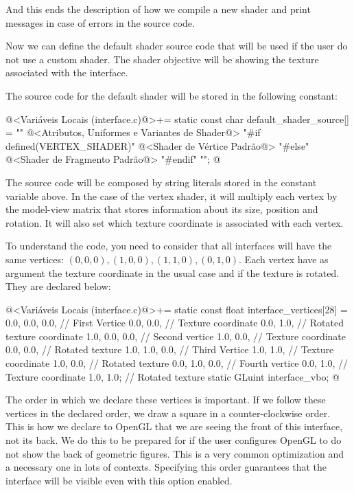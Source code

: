 And this ends the description of how we compile a new shader and print
messages in case of errors in the source code.

Now we can define the default shader source code that will be used if
the user do not use a custom shader. The shader objective will be
showing the texture associated with the interface.

The source code for the default shader will be stored in the following
constant:

\iniciocodigo
@<Variáveis Locais (interface.c)@>+=
static const char default_shader_source[] = ""
@<Atributos, Uniformes e Variantes de Shader@>
"#if defined(VERTEX_SHADER)\n"
@<Shader de Vértice Padrão@>
"#else\n"
@<Shader de Fragmento Padrão@>
"#endif\n"
                                           "";
@
\fimcodigo

The source code will be composed by string literals stored in the
constant variable above. In the case of the vertex shader, it will
multiply each vertex by the model-view matrix that stores information
about its size, position and rotation. It will also set which texture
coordinate is associated with each vertex.

To understand the code, you need to consider that all interfaces will
have the same vertices: $(0, 0, 0), (1, 0, 0), (1, 1, 0), (0, 1,
0)$. Each vertex have as argument the texture coordinate in the usual
case and if the texture is rotated. They are declared below:

\iniciocodigo
@<Variáveis Locais (interface.c)@>+=
static const float interface_vertices[28] = {
  0.0, 0.0, 0.0, // First Vertice
  0.0, 0.0,     // Texture coordinate
  0.0, 1.0,    // Rotated texture coordinate
  1.0, 0.0, 0.0, // Second vertice
  1.0, 0.0,     // Texture coordinate
  0.0, 0.0,    // Rotated texture
  1.0, 1.0, 0.0,  // Third Vertice
  1.0, 1.0,      // Texture coordinate
  1.0, 0.0,     // Rotated texture
  0.0, 1.0, 0.0, // Fourth vertice
  0.0, 1.0,     // Texture coordinate
  1.0, 1.0};   // Rotated texture
static GLuint interface_vbo;
@
\fimcodigo

The order in which we declare these vertices is important. If we
follow these vertices in the declared order, we draw a square in a
counter-clockwise order. This is how we declare to OpenGL that we are
seeing the front of this interface, not its back. We do this to be
prepared for if the user configures OpenGL to do not show the back of
geometric figures. This is a very common optimization and a necessary
one in lots of contexts. Specifying this order guarantees that the
interface will be visible even with this option enabled.

